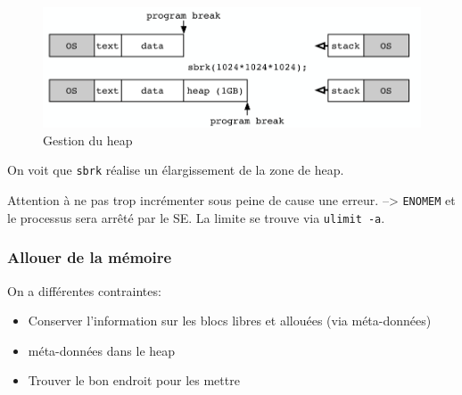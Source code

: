 \begin{figure}
\centering
\includegraphics{image-48.png}
\caption{Gestion du heap}
\end{figure}

On voit que \texttt{sbrk} réalise un élargissement de la zone de heap.

\begin{Shaded}
\begin{Highlighting}[]
\PreprocessorTok{ }

\OperatorTok{(} \OperatorTok{*}\OperatorTok{);}            
 \OperatorTok{*}\OperatorTok{(}\OperatorTok{);} 
\end{Highlighting}
\end{Shaded}

Attention à ne pas trop incrémenter sous peine de cause une erreur.
--\textgreater{} \texttt{ENOMEM} et le processus sera arrêté par le SE.
La limite se trouve via \texttt{ulimit\ -a}.

\subsubsection{Allouer de la mémoire}\label{allouer-de-la-muxe9moire}

On a différentes contraintes:

\begin{itemize}
\tightlist
\item
  Conserver l'information sur les blocs libres et allouées (via
  méta-données)
\item
  méta-données dans le heap
\item
  Trouver le bon endroit pour les mettre
\end{itemize}

